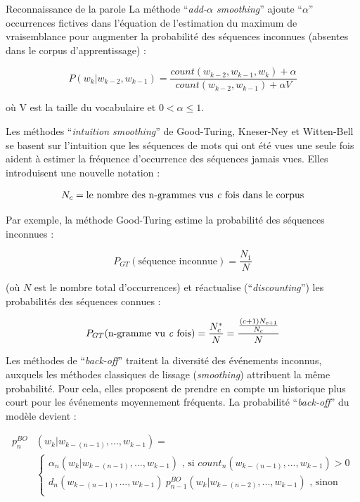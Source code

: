 \documentclass{style/these}
\let\oldcite=\cite
\renewcommand{\cite}[1]{{\fontfamily{qcs}\selectfont{\color{darkerblue}[\oldcite{#1}]}}}
\begin{document}
\begin{part}{Reconnaissance de la parole}
La méthode ``\textit{add-$\alpha$ smoothing}'' ajoute ``$\alpha$'' occurrences fictives dans l'équation de l'estimation du maximum de vraisemblance pour augmenter la probabilité des séquences inconnues (absentes dans le corpus d'apprentissage) :

\begin{equation}
P(w_{k}|w_{k-2},w_{k-1})=\frac{count(w_{k-2},w_{k-1},w_{k}) + \alpha}{count(w_{k-2},w_{k-1}) + \alpha V}
\end{equation}

\hskip-18pt où V est la taille du vocabulaire et $0 < \alpha \leq 1$.

Les méthodes ``\textit{intuition smoothing}'' de Good-Turing, Kneser-Ney et Witten-Bell se basent sur l'intuition que les séquences de mots qui ont été vues une seule fois aident à estimer la fréquence d'occurrence des séquences jamais vues. Elles introduisent une nouvelle notation :

$$N_{c} = \text{le nombre des n-grammes vus \textit{c} fois dans le corpus}$$

Par exemple, la méthode Good-Turing \cite{Good:1953} estime la probabilité des séquences inconnues :

\begin{equation}
	P_{GT}(\text{séquence inconnue}) = \frac{N_{1}}{N}
\end{equation}

\hskip-18pt (où $N$ est le nombre total d'occurrences) et réactualise (``\textit{discounting}'') les probabilités des séquences connues :

\begin{equation}
	P_{GT}(\text{n-gramme vu \textit{c} fois})= \frac{N_{c}^{*}}{N}=\frac{\frac{(c+1)N_{c+1}}{N_{c}}}{N}
\end{equation}

Les méthodes de ``\textit{back-off}'' traitent la diversité des événements inconnus, auxquels les méthodes classiques de lissage (\textit{smoothing}) attribuent la même probabilité. 
Pour cela, elles proposent de prendre en compte un historique plus court pour les événements moyennement fréquents. 
La probabilité ``\textit{back-off}'' du modèle devient :

\begin{equation}
\begin{split}
	p_{n}^{BO}&(w_{k}|w_{k-(n-1)},...,w_{k-1}) =\\
	& \left\{	
	\begin{matrix}
	\alpha_{n}(w_{k}|w_{k-(n-1)},...,w_{k-1}) \text{ , si } count_{n}(w_{k-(n-1)},...,w_{k-1}) > 0     \\ 
	d_{n}(w_{k-(n-1)},...,w_{k-1}) \ p_{n-1}^{BO} (w_{k}|w_{k-(n-2)},...,w_{k-1}) \text{ , sinon} 	\\
	\end{matrix}
	\right.
\end{split}
\end{equation}


\end{part}
\end{document}
